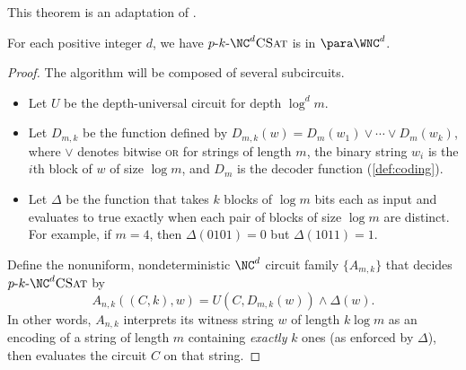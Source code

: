 This theorem is an adaptation of \autocite[Lemma~3.3]{cc97lim}.

\begin{lemma}\label{lem:pkncsatmem}
  For each positive integer $d$, we have $\pNCSAT$ is in $\para \WNC^d$.
\end{lemma}
\begin{proof}
  The algorithm will be composed of several subcircuits.
  \begin{itemize}
  \item Let $U$ be the depth-universal circuit \autocite{ch85} for depth $\log^d m$.
  \item Let $D_{m, k}$ be the function defined by $D_{m, k}(w) = D_m(w_1) \lor \dotsb \lor D_m(w_k)$, where $\lor$ denotes bitwise \textsc{or} for strings of length $m$, the binary string $w_i$ is the $i$th block of $w$ of size $\log m$, and $D_m$ is the decoder function (\autoref{def:coding}).
  \item Let $\Delta$ be the function that takes $k$ blocks of $\log m$ bits each as input and evaluates to true exactly when each pair of blocks of size $\log m$ are distinct. For example, if $m = 4$, then $\Delta(0101) = 0$ but $\Delta(1011) = 1$.
  \end{itemize}
  Define the nonuniform, nondeterministic $\NC^d$ circuit family $\{A_{m, k}\}$ that decides $\pNCSAT$ by
  \[
  A_{n, k}((C, k), w) = U(C, D_{m, k}(w)) \land \Delta(w).
  \]
  In other words, $A_{n, k}$ interprets its witness string $w$ of length $k \log m$ as an encoding of a string of length $m$ containing \emph{exactly} $k$ ones (as enforced by $\Delta$), then evaluates the circuit $C$ on that string.


\end{proof}
